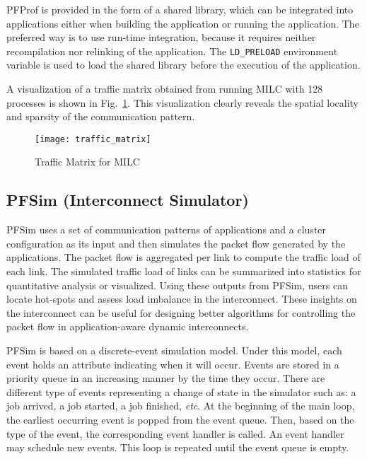 PFProf is provided in the form of a shared library, which can be
integrated into applications either when building the application or
running the application. The preferred way is to use run-time
integration, because it requires neither recompilation nor relinking of
the application. The \lstinline!LD_PRELOAD! environment
variable is used to load the shared library before the execution of the
application.

A visualization of a traffic matrix obtained from running MILC with 128
processes is shown in Fig.~\ref{fig:traffic-matrix}. This visualization
clearly reveals the spatial locality and sparsity of the communication
pattern.

\begin{figure}
    \centering
    \texttt{[image: traffic\_matrix]}
    \caption{Traffic Matrix for MILC}%
    \label{fig:traffic-matrix}
\end{figure}

\subsection{PFSim (Interconnect Simulator)}\label{ii-pfsim}

PFSim uses a set of communication patterns of applications and a cluster
configuration as its input and then simulates the packet flow generated
by the applications. The packet flow is aggregated per link to compute
the traffic load of each link. The simulated traffic load of links can
be summarized into statistics for quantitative analysis or visualized.
Using these outputs from PFSim, users can locate hot-spots and assess
load imbalance in the interconnect. These insights on the interconnect
can be useful for designing better algorithms for controlling the packet
flow in application-aware dynamic interconnects.

PFSim is based on a discrete-event simulation model. Under this model,
each event holds an attribute indicating when it will occur. Events are
stored in a priority queue in an increasing manner by the time they
occur. There are different type of events representing a change of state
in the simulator such as: a job arrived, a job started, a job finished,
\emph{etc}. At the beginning of the main loop, the earliest occurring
event is popped from the event queue. Then, based on the type of the
event, the corresponding event handler is called. An event handler may
schedule new events. This loop is repeated until the event queue is
empty.

